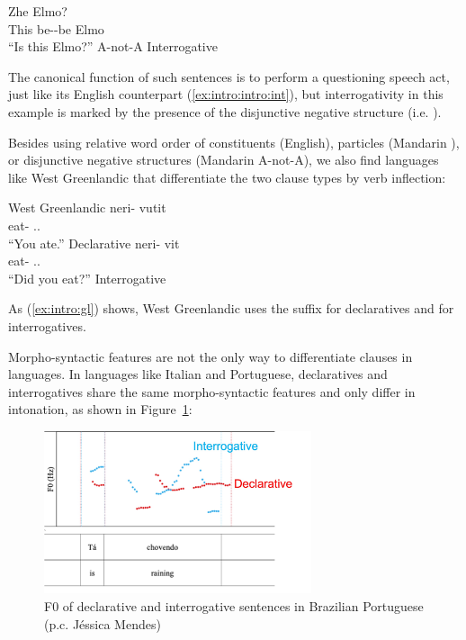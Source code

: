 \gll Zhe  Elmo?\\
This be-\Neg-be Elmo\\
``Is this Elmo?'' \hfill A-not-A Interrogative
\eex

The canonical function of such sentences is to perform a questioning speech act, just like its English counterpart (\ref{ex:intro:intro:int}), but interrogativity in this example is marked by the presence of the disjunctive negative structure (i.e. ). 

Besides using relative word order of constituents (English), particles (Mandarin ), or disjunctive negative structures (Mandarin A-not-A), we also find languages like West Greenlandic that differentiate the two clause types by verb inflection:

West Greenlandic
\bxl
\label{ex:intro:gl:dec}
\gll neri- vutit\\
eat- \Ind.\Ssg.\Pst{}\\
``You ate.'' \hfill Declarative
\ex \label{ex:intro:gl:int}
\gll neri- vit\\
eat- \Int.\Ssg.\Pst{}\\
``Did you eat?'' \hfill Interrogative
\exl
\hspace*{\fill} \cite[18, ex (50)]{konig2007}
\eex

As (\ref{ex:intro:gl}) shows, West Greenlandic uses the suffix  for declaratives and  for interrogatives.

Morpho-syntactic features are not the only way to differentiate clauses in languages. In languages like Italian and Portuguese, declaratives and interrogatives share the same morpho-syntactic features and only differ in intonation, as shown in Figure~\ref{fig:intro:PB}:
\begin{figure}[H]
    \centering
    \includegraphics[width=0.7\textwidth]{figures/PB.jpg}
    \caption{F0 of declarative and interrogative sentences in Brazilian Portuguese (p.c. J\'essica Mendes)}
    \label{fig:intro:PB}
\end{figure}

